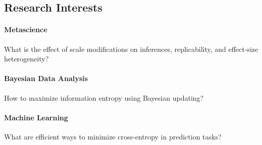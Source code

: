 \documentclass[10pt]{FreemanCV}
\begin{document}
\begin{paracol}{2}
\section{Research Interests}

\paragraph{Metascience}
What is the effect of scale modifications on inferences, replicability, and
effect-size heterogeneity? 

\vspace{-6pt}

\paragraph{Bayesian Data Analysis}
How to maximize information entropy using Bayesian updating?

\vspace{-6pt}

\paragraph{Machine Learning}
What are efficient ways to minimize cross-entropy in prediction tasks?







\end{paracol}
\end{document}
